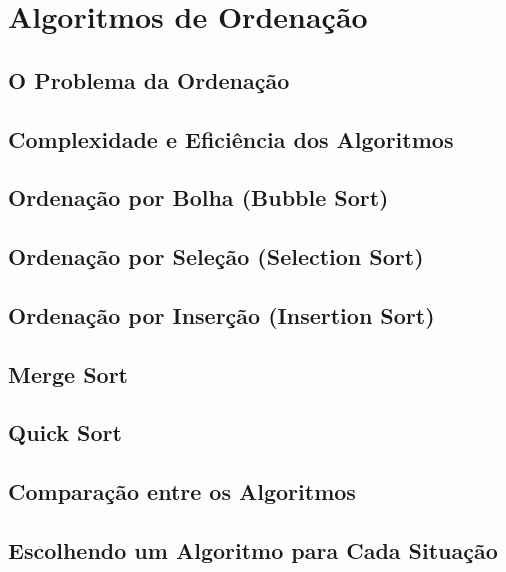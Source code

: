 \chapter{Algoritmos de Ordenação}

\section{O Problema da Ordenação}

\section{Complexidade e Eficiência dos Algoritmos}

\section{Ordenação por Bolha (Bubble Sort)}

\section{Ordenação por Seleção (Selection Sort)}

\section{Ordenação por Inserção (Insertion Sort)}

\section{Merge Sort}

\section{Quick Sort}

\section{Comparação entre os Algoritmos}

\section{Escolhendo um Algoritmo para Cada Situação}
